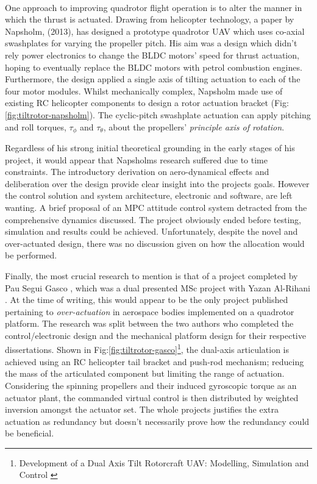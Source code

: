 \\
One approach to improving quadrotor flight operation is to alter the manner in which the thrust is actuated. Drawing from helicopter technology, a paper by Napsholm, (2013)\cite{napsholm}, has designed a prototype quadrotor UAV which uses co-axial swashplates for varying the propeller pitch. His aim was a design which didn't rely power electronics to change the BLDC motors' speed for thrust actuation, hoping to eventually replace the BLDC motors with petrol combustion engines. Furthermore, the design applied a single axis of tilting actuation to each of the four motor modules. Whilst mechanically complex, Napsholm made use of existing RC helicopter components to design a rotor actuation bracket (Fig:\ref{fig:tiltrotor-napsholm}). The cyclic-pitch swashplate actuation \cite{autonomousrobotspitch} can apply pitching and roll torques, $\tau_{\phi}$ and $\tau_{\theta}$, about the propellers' \emph{principle axis of rotation}.
\par
Regardless of his strong initial theoretical grounding in the early stages of his project, it would appear that Napsholms research suffered due to time constraints. The introductory derivation on aero-dynamical effects and deliberation over the design provide clear insight into the projects goals. However the control solution and system architecture, electronic and software, are left wanting. A brief proposal of an MPC attitude control system detracted from the comprehensive dynamics discussed. The project obviously ended before testing, simulation and results could be achieved. Unfortunately, despite the novel and over-actuated design, there was no discussion given on how the allocation would be performed.
\par
Finally, the most crucial research to mention is that of a project completed by Pau Segui Gasco \cite{tiltgasco}, which was a dual presented MSc project with Yazan Al-Rihani \cite{tiltrihani}. At the time of writing, this would appear to be the only project published pertaining to \emph{over-actuation} in aerospace bodies implemented on a quadrotor platform. The research was split between the two authors who completed the control/electronic design and the mechanical platform design for their respective dissertations. Shown in Fig:\ref{fig:tiltrotor-gasco}\footnote{Development of a Dual Axis Tilt Rotorcraft UAV: Modelling, Simulation and Control \cite{tiltgasco}}, the dual-axis articulation is achieved using an RC helicopter tail bracket and push-rod mechanism; reducing the mass of the articulated component but limiting the range of actuation. Considering the spinning propellers and their induced gyroscopic torque as an actuator plant, the commanded virtual control is then distributed by weighted inversion amongst the actuator set. The whole projects justifies the extra actuation as redundancy but doesn't necessarily prove how the redundancy could be beneficial.
